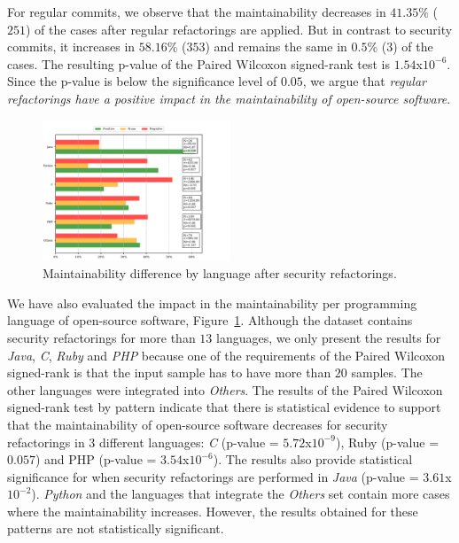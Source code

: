 \documentclass[10pt,conference]{IEEEtran}
\begin{document}
For regular commits, we observe that the maintainability decreases in $41.35\%$
($251$) of the cases after regular refactorings are applied. But in contrast
to security commits, it increases in $58.16\%$ ($353$) and remains the same in
$0.5\%$ ($3$) of the cases. The resulting p-value of the Paired Wilcoxon signed-rank
test is $1.54$x$10^{-6}$. Since the p-value is below the significance level of
$0.05$, we argue that \emph{regular refactorings have a
positive impact in the maintainability of open-source software}.

\begin{figure}[h]
  \centering
  \includegraphics[width=0.5\textwidth]{figures/language.pdf}
  \caption{Maintainability difference by language after security refactorings.}
  \label{fig:lang_main}
\end{figure}

We have also evaluated the impact in the maintainability per programming language
of open-source software, Figure~\ref{fig:lang_main}. Although
the dataset contains security refactorings for more than $13$ languages, we only
present the results for \emph{Java}, \emph{C}, \emph{Ruby} and \emph{PHP}
because one of the requirements of the Paired Wilcoxon signed-rank is that the
input sample has to have more than $20$ samples. The other languages were
integrated into \emph{Others}. The results of the Paired Wilcoxon signed-rank
test by pattern indicate that there is statistical evidence to support that the
maintainability of open-source software decreases for security refactorings in
$3$ different languages: \emph{C} (p-value = $5.72$x$10^{-9}$), Ruby (p-value = $0.057$) and
PHP (p-value = $3.54$x$10^{-6}$). The results also provide statistical significance
for when security refactorings are performed in \emph{Java} (p-value =
$3.61$x$10^{-2}$). \emph{Python} and the languages that integrate the
\emph{Others} set contain more cases where the maintainability increases.
However, the results obtained for these patterns are not statistically
significant.
\end{document}
